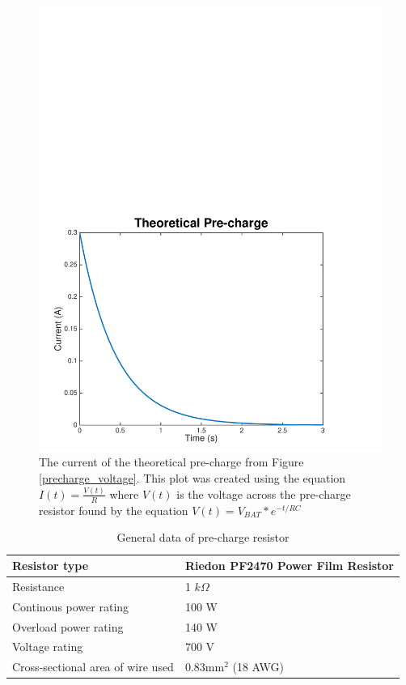 \documentclass{article}
\begin{document}
\begin{figure}[H]
    \centering
    \includegraphics[width = 0.8 \textwidth]{precharge_current}
    \caption{The current of the theoretical pre-charge from Figure \ref{precharge_voltage}. This plot was created using the equation $I(t) = \frac{V(t)}{R}$ where $V(t)$ is the voltage across the pre-charge resistor found by the equation $V(t) = V_{BAT} * e^{-t/RC}$ }
    \label{precharge_current}
\end{figure}

    \begin{table}[H]
	    \centering
	    \begin{tabular}{|l|l|}
	    \hline
	    Resistor type & Riedon PF2470 Power Film Resistor \\ \hline
	    Resistance & 1 $k\Omega$ \\ \hline
	    Continous power rating & 100 W \\ \hline
	    Overload power rating & 140 W \\ \hline
	    Voltage rating & 700 V \\ \hline
	    Cross-sectional area of wire used & 0.83mm$^2$ (18 AWG)\\ \hline
	    \end{tabular}
	    \caption{General data of pre-charge resistor}
	    \label{prechargeresistor}
	\end{table}
\end{document}
